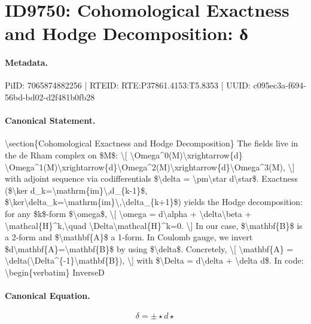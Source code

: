 \section*{ID9750: Cohomological Exactness and Hodge Decomposition: δ}
\paragraph{Metadata.}
PiID: 7065874882256 | RTEID: RTE:P37861.4153:T5.8353 | UUID: c095ec3a-f694-56bd-bd02-d2f481b0fb28

\paragraph{Canonical Statement.}
\textbackslash{}section\{Cohomological Exactness and Hodge Decomposition\} The fields live in the de Rham complex on \$M\$: \textbackslash{}[ \textbackslash{}Omega\textasciicircum{}0(M)\textbackslash{}xrightarrow\{d\} \textbackslash{}Omega\textasciicircum{}1(M)\textbackslash{}xrightarrow\{d\}\textbackslash{}Omega\textasciicircum{}2(M)\textbackslash{}xrightarrow\{d\}\textbackslash{}Omega\textasciicircum{}3(M), \textbackslash{}] with adjoint sequence via codifferentials \$\textbackslash{}delta = \textbackslash{}pm\textbackslash{}star d\textbackslash{}star\$. Exactness (\$\textbackslash{}ker d\_k=\textbackslash{}mathrm\{im\}\textbackslash{},d\_\{k-1\}\$, \$\textbackslash{}ker\textbackslash{}delta\_k=\textbackslash{}mathrm\{im\}\textbackslash{},\textbackslash{}delta\_\{k+1\}\$) yields the Hodge decomposition: for any \$k\$-form \$\textbackslash{}omega\$, \textbackslash{}[ \textbackslash{}omega = d\textbackslash{}alpha + \textbackslash{}delta\textbackslash{}beta + \textbackslash{}mathcal\{H\}\textasciicircum{}k,\textbackslash{}quad \textbackslash{}Delta\textbackslash{}mathcal\{H\}\textasciicircum{}k=0. \textbackslash{}] In our case, \$\textbackslash{}mathbf\{B\}\$ is a 2-form and \$\textbackslash{}mathbf\{A\}\$ a 1-form. In Coulomb gauge, we invert \$d\textbackslash{}mathbf\{A\}=\textbackslash{}mathbf\{B\}\$ by using \$\textbackslash{}delta\$. Concretely, \textbackslash{}[ \textbackslash{}mathbf\{A\} = \textbackslash{}delta(\textbackslash{}Delta\textasciicircum{}\{-1\}\textbackslash{}mathbf\{B\}), \textbackslash{}] with \$\textbackslash{}Delta = d\textbackslash{}delta + \textbackslash{}delta d\$. In code: \textbackslash{}begin\{verbatim\} InverseD

\paragraph{Canonical Equation.}
\[
\delta = \pm\star d\star
\]

